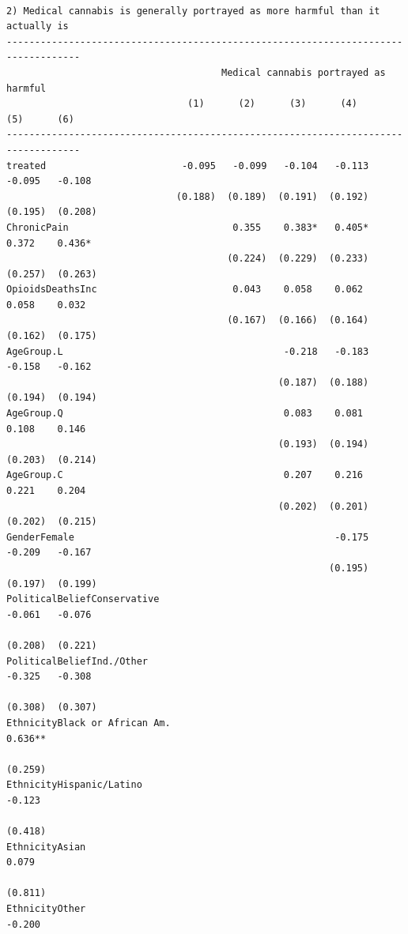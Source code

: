 \documentclass[
]{article}
\begin{document}
\begin{verbatim}

2) Medical cannabis is generally portrayed as more harmful than it actually is
-----------------------------------------------------------------------------------
                                      Medical cannabis portrayed as harmful        
                                (1)      (2)      (3)      (4)      (5)      (6)   
-----------------------------------------------------------------------------------
treated                        -0.095   -0.099   -0.104   -0.113   -0.095   -0.108 
                              (0.188)  (0.189)  (0.191)  (0.192)  (0.195)  (0.208) 
ChronicPain                             0.355    0.383*   0.405*   0.372    0.436* 
                                       (0.224)  (0.229)  (0.233)  (0.257)  (0.263) 
OpioidsDeathsInc                        0.043    0.058    0.062    0.058    0.032  
                                       (0.167)  (0.166)  (0.164)  (0.162)  (0.175) 
AgeGroup.L                                       -0.218   -0.183   -0.158   -0.162 
                                                (0.187)  (0.188)  (0.194)  (0.194) 
AgeGroup.Q                                       0.083    0.081    0.108    0.146  
                                                (0.193)  (0.194)  (0.203)  (0.214) 
AgeGroup.C                                       0.207    0.216    0.221    0.204  
                                                (0.202)  (0.201)  (0.202)  (0.215) 
GenderFemale                                              -0.175   -0.209   -0.167 
                                                         (0.195)  (0.197)  (0.199) 
PoliticalBeliefConservative                                        -0.061   -0.076 
                                                                  (0.208)  (0.221) 
PoliticalBeliefInd./Other                                          -0.325   -0.308 
                                                                  (0.308)  (0.307) 
EthnicityBlack or African Am.                                              0.636** 
                                                                           (0.259) 
EthnicityHispanic/Latino                                                    -0.123 
                                                                           (0.418) 
EthnicityAsian                                                              0.079  
                                                                           (0.811) 
EthnicityOther                                                              -0.200 

\end{verbatim}
\end{document}
